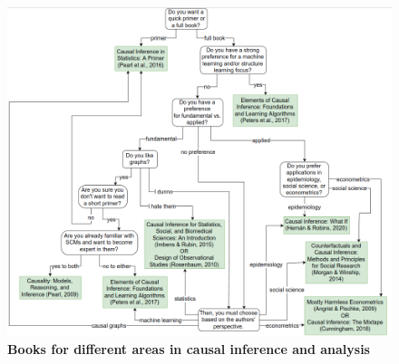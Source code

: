 \documentclass[11pt]{article}
\begin{document}
\begin{figure}
\begin{minipage}[t]{1\linewidth}
  \centering
  \centerline{\includegraphics[scale = 0.42]{books_flowchart.png}}
\end{minipage}
\caption{\footnotesize{\textbf{Books for different areas in causal inference and analysis  \citep{neal2020introduction}}}}
\label{fig: books_flowchart}
\end{figure}
\end{document}
